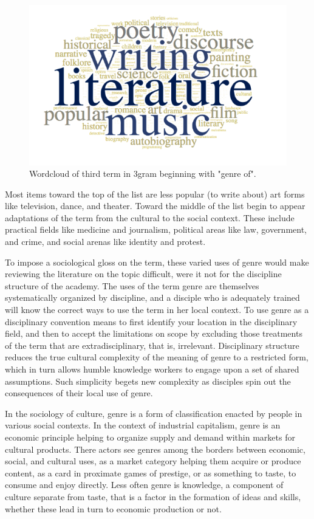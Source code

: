\documentclass[]{book}
\theoremstyle{definition}
\theoremstyle{definition}
\theoremstyle{definition}
\theoremstyle{remark}
\begin{document}
\begin{figure}

{\centering \includegraphics[width=8.4in]{img/genre-goog} 

}

\caption{Wordcloud of third term in 3gram beginning with "genre of".}\label{fig:genre-goog}
\end{figure}

Most items toward the top of the list are less popular (to write about)
art forms like television, dance, and theater. Toward the middle of the
list begin to appear adaptations of the term from the cultural to the
social context. These include practical fields like medicine and
journalism, political areas like law, government, and crime, and social
arenas like identity and protest.

To impose a sociological gloss on the term, these varied uses of genre
would make reviewing the literature on the topic difficult, were it not
for the discipline structure of the academy. The uses of the term genre
are themselves systematically organized by discipline, and a disciple
who is adequately trained will know the correct ways to use the term in
her local context. To use genre as a disciplinary convention means to
first identify your location in the disciplinary field, and then to
accept the limitations on scope by excluding those treatments of the
term that are extradisciplinary, that is, irrelevant. Disciplinary
structure reduces the true cultural complexity of the meaning of genre
to a restricted form, which in turn allows humble knowledge workers to
engage upon a set of shared assumptions. Such simplicity begets new
complexity as disciples spin out the consequences of their local use of
genre.

In the sociology of culture, genre is a form of classification enacted
by people in various social contexts. In the context of industrial
capitalism, genre is an economic principle helping to organize supply
and demand within markets for cultural products. There actors see genres
among the borders between economic, social, and cultural uses, as a
market category helping them acquire or produce content, as a card in
proximate games of prestige, or as something to taste, to consume and
enjoy directly. Less often genre is knowledge, a component of culture
separate from taste, that is a factor in the formation of ideas and
skills, whether these lead in turn to economic production or not.
\end{document}

